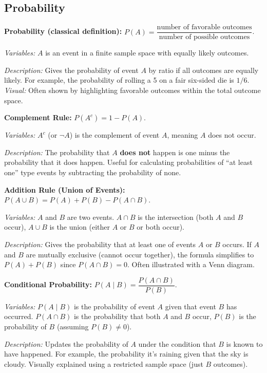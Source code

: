 \documentclass{article}
\begin{document}
\subsection*{Probability}

\textbf{Probability (classical definition):} $P(A) = \dfrac{\text{number of favorable outcomes}}{\text{number of possible outcomes}}$.

\textit{Variables:} $A$ is an event in a finite sample space with equally likely outcomes.

\textit{Description:} Gives the probability of event $A$ by ratio if all outcomes are equally likely. For example, the probability of rolling a 5 on a fair six-sided die is $1/6$. \textit{Visual:} Often shown by highlighting favorable outcomes within the total outcome space.

\textbf{Complement Rule:} $P(A^c) = 1 - P(A)$.

\textit{Variables:} $A^c$ (or $\neg A$) is the complement of event $A$, meaning $A$ does not occur.

\textit{Description:} The probability that $A$ \textbf{does not} happen is one minus the probability that it does happen. Useful for calculating probabilities of “at least one” type events by subtracting the probability of none.

\textbf{Addition Rule (Union of Events):} $P(A \cup B) = P(A) + P(B) - P(A \cap B)$.

\textit{Variables:} $A$ and $B$ are two events. $A \cap B$ is the intersection (both $A$ and $B$ occur), $A \cup B$ is the union (either $A$ or $B$ or both occur).

\textit{Description:} Gives the probability that at least one of events $A$ or $B$ occurs. If $A$ and $B$ are mutually exclusive (cannot occur together), the formula simplifies to $P(A)+P(B)$ since $P(A\cap B)=0$. Often illustrated with a Venn diagram.

\textbf{Conditional Probability:} $P(A \mid B) = \dfrac{P(A \cap B)}{P(B)}$.

\textit{Variables:} $P(A\mid B)$ is the probability of event $A$ given that event $B$ has occurred. $P(A \cap B)$ is the probability that both $A$ and $B$ occur, $P(B)$ is the probability of $B$ (assuming $P(B)\neq0$).

\textit{Description:} Updates the probability of $A$ under the condition that $B$ is known to have happened. For example, the probability it’s raining given that the sky is cloudy. Visually explained using a restricted sample space (just $B$ outcomes).
\end{document}
